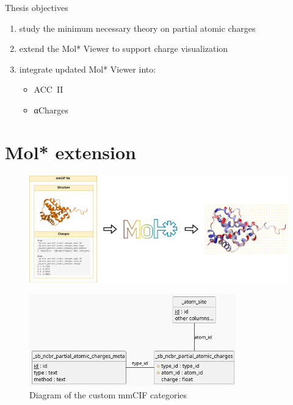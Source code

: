 \documentclass[
]{beamer}
\begin{document}
\begin{frame}{Thesis objectives}
  \begin{enumerate}
    \item study the minimum necessary theory on partial atomic charges
    \item extend the Mol* Viewer to support charge visualization
    \item integrate updated Mol* Viewer into:
    \begin{itemize}
      \item ACC~II
      \item αCharges
    \end{itemize}
  \end{enumerate}
\end{frame}

\section{Mol* extension}

\begin{frame}{}
  \begin{figure}
    \includegraphics[width=\textwidth,keepaspectratio]{images/molstar-use-case.png}
  \end{figure}
\end{frame}

\begin{frame}{}
  \begin{figure}
    \includegraphics[width=0.8\textwidth,keepaspectratio]{images/mmcif_erd.png}
    \caption{Diagram of the custom mmCIF categories}
  \end{figure}
\end{frame}
\end{document}

